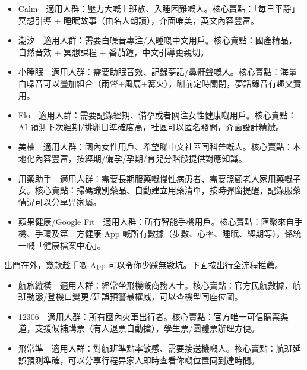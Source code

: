 
\begin{itemize}
  \item Calm　適用人群：壓力大嘅上班族、入睡困難嘅人。核心賣點：「每日平靜」冥想引導 + 睡眠故事（由名人朗讀），介面唯美，英文內容豐富。
  \item 潮汐　適用人群：需要白噪音專注/入睡嘅中文用戶。核心賣點：國產精品，自然音效 + 冥想課程 + 番茄鐘，中文引導更親切。
  \item 小睡眠　適用人群：需要助眠音效、記錄夢話/鼻鼾聲嘅人。核心賣點：海量白噪音可以疊加組合（雨聲+風扇+篝火），瞓前定時關閉，夢話錄音有趣又實用。
\end{itemize}


\begin{itemize}
  \item Flo　適用人群：需要記錄經期、備孕或者關注女性健康嘅用戶。核心賣點：AI 預測下次經期/排卵日準確度高，社區可以匿名發問，介面設計精緻。
  \item 美柚　適用人群：國內女性用戶、希望睇中文社區同科普嘅人。核心賣點：本地化內容豐富，按經期/備孕/孕期/育兒分階段提供對應知識。
\end{itemize}


\begin{itemize}
  \item 用藥助手　適用人群：需要長期服藥嘅慢性病患者、需要照顧老人家用藥嘅子女。核心賣點：掃碼識別藥品、自動建立用藥清單，按時彈窗提醒，記錄服藥情況可以分享畀家屬。
\end{itemize}


\begin{itemize}
  \item 蘋果健康/Google Fit　適用人群：所有智能手機用戶。核心賣點：匯聚來自手機、手環及第三方健康 App 嘅所有數據（步數、心率、睡眠、經期等），係統一嘅「健康檔案中心」。
\end{itemize}


出門在外，幾款趁手嘅 App 可以令你少踩無數坑。下面按出行全流程推薦。


\begin{itemize}
  \item 航旅縱橫　適用人群：經常坐飛機嘅商務人士。核心賣點：官方民航數據，航班動態/登機口變更/延誤預警最權威，可以查機型同座位圖。
  \item 12306　適用人群：所有國內火車出行者。核心賣點：官方唯一可信購票渠道，支援候補購票（有人退票自動搶），學生票/團體票辦理方便。
  \item 飛常準　適用人群：對航班準點率敏感、需要接送機嘅人。核心賣點：航班延誤預測準確，可以分享行程畀家人即時查看你嘅位置同到達時間。
\end{itemize}

